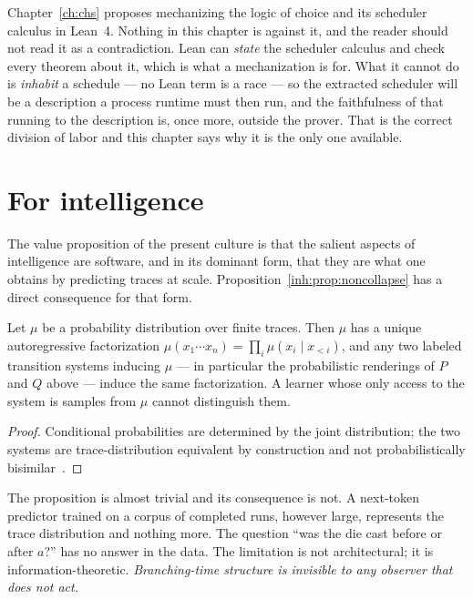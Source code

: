 \begin{remark}
\label{inh:rmk:lean}
Chapter~\ref{ch:chs} proposes mechanizing the logic of choice and its
scheduler calculus in Lean~4.
Nothing in this chapter is against it, and the reader should not read
it as a contradiction.
Lean can \emph{state} the scheduler calculus and check every theorem
about it, which is what a mechanization is for.
What it cannot do is \emph{inhabit} a schedule --- no Lean term is a
race --- so the extracted scheduler will be a description a process
runtime must then run, and the faithfulness of that running to the
description is, once more, outside the prover.
That is the correct division of labor and this chapter says why it is
the only one available.
\end{remark}

\section{For intelligence}
\label{inh:sec:ai}

The value proposition of the present culture is that the salient
aspects of intelligence are software, and in its dominant form, that
they are what one obtains by predicting traces at scale.
Proposition~\ref{inh:prop:noncollapse} has a direct consequence for
that form.

\begin{proposition}
\label{inh:prop:invisible}
Let $\mu$ be a probability distribution over finite traces.
Then $\mu$ has a unique autoregressive factorization
$\mu(x_1\cdots x_n) = \prod_i \mu(x_i \mid x_{<i})$, and any two
labeled transition systems inducing $\mu$ --- in particular the
probabilistic renderings of $P$ and $Q$ above --- induce the same
factorization.
A learner whose only access to the system is samples from $\mu$ cannot
distinguish them.
\end{proposition}

\begin{proof}
Conditional probabilities are determined by the joint distribution; the
two systems are trace-distribution equivalent by construction and not
probabilistically bisimilar~\cite{LarsenSkou91}.
\end{proof}

The proposition is almost trivial and its consequence is not.
A next-token predictor trained on a corpus of completed runs, however
large, represents the trace distribution and nothing more.
The question ``was the die cast before or after $a$?'' has no answer in
the data.
The limitation is not architectural; it is information-theoretic.
\emph{Branching-time structure is invisible to any observer that does
not act.}

